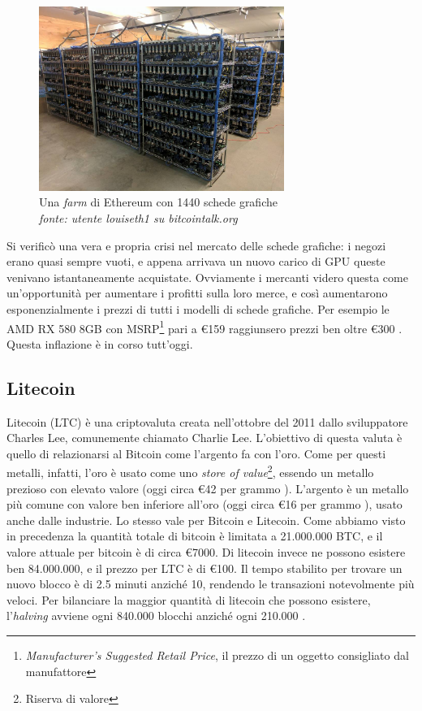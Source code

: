 \documentclass {article}
\begin{document}
\vspace {0.5cm}
\begin{figure}[htb!]
\includegraphics [width = 8cm] {ethfarm.jpeg}
\centering
\captionsetup{width=1.4\linewidth}
\caption {Una \textit{farm} di Ethereum con 1440 schede grafiche\\\textit{fonte: utente louiseth1 su bitcointalk.org}}
\end{figure}
\vspace {0.2cm}
\noindent
%
Si verificò una vera e propria crisi nel mercato delle schede grafiche: i negozi erano quasi sempre vuoti, e appena arrivava un nuovo carico di GPU queste venivano istantaneamente acquistate.
Ovviamente i mercanti videro questa come un'opportunità per aumentare i profitti sulla loro merce, e così aumentarono esponenzialmente i prezzi di tutti i modelli di schede grafiche.
Per esempio le AMD RX 580 8GB con MSRP\footnote{\textit{Manufacturer's Suggested Retail Price}, il prezzo di un oggetto consigliato dal manufattore} pari a \euro{159} raggiunsero prezzi ben oltre \euro{300} \cite{ethboom}.
Questa inflazione è in corso tutt'oggi.


\subsection {Litecoin}


Litecoin (LTC) è una criptovaluta creata nell'ottobre del 2011 dallo sviluppatore Charles Lee, comunemente chiamato Charlie Lee. L'obiettivo di questa valuta è quello di relazionarsi al Bitcoin come l'argento fa con l'oro.
Come per questi metalli, infatti, l'oro è usato come uno \textit{store of value}\footnote{Riserva di valore}, essendo un metallo prezioso con elevato valore (oggi circa \euro{42} per grammo \cite{silverprice}). L'argento è un metallo più comune con valore ben inferiore all'oro (oggi circa \euro{16} per grammo \cite{goldprice}), usato anche dalle industrie.
Lo stesso vale per Bitcoin e Litecoin. Come abbiamo visto in precedenza la quantità totale di bitcoin è limitata a 21.000.000 BTC, e il valore attuale per bitcoin è di circa \euro{7000}.
Di litecoin invece ne possono esistere ben 84.000.000, e il prezzo per LTC è di \euro{100}.
Il tempo stabilito per trovare un nuovo blocco è di 2.5 minuti anziché 10, rendendo le transazioni notevolmente più veloci.
Per bilanciare la maggior quantità di litecoin che possono esistere, l'\textit{halving} avviene ogni 840.000 blocchi anziché ogni 210.000 \cite{ltcvsbtc}.
\end{document}
